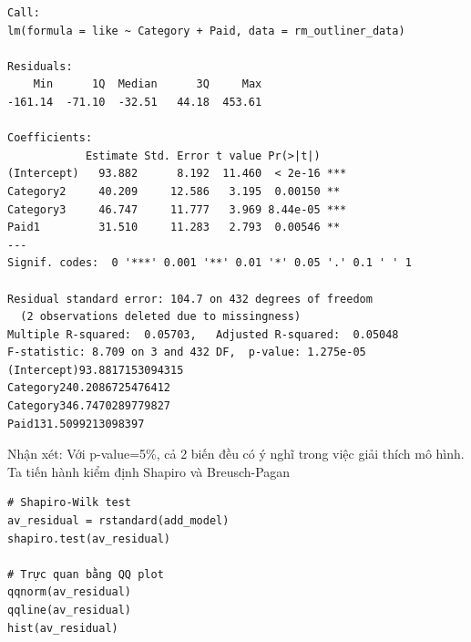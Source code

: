 \begin{itemize}
\begin{lstlisting}
Call:
lm(formula = like ~ Category + Paid, data = rm_outliner_data)

Residuals:
    Min      1Q  Median      3Q     Max 
-161.14  -71.10  -32.51   44.18  453.61 

Coefficients:
            Estimate Std. Error t value Pr(>|t|)    
(Intercept)   93.882      8.192  11.460  < 2e-16 ***
Category2     40.209     12.586   3.195  0.00150 ** 
Category3     46.747     11.777   3.969 8.44e-05 ***
Paid1         31.510     11.283   2.793  0.00546 ** 
---
Signif. codes:  0 '***' 0.001 '**' 0.01 '*' 0.05 '.' 0.1 ' ' 1

Residual standard error: 104.7 on 432 degrees of freedom
  (2 observations deleted due to missingness)
Multiple R-squared:  0.05703,	Adjusted R-squared:  0.05048 
F-statistic: 8.709 on 3 and 432 DF,  p-value: 1.275e-05
(Intercept)93.8817153094315
Category240.2086725476412
Category346.7470289779827
Paid131.5099213098397

    \end{lstlisting}
   Nhận xét: Với p-value=5\%, cả 2 biến đều có ý nghĩ trong việc giải thích mô hình. Ta tiến hành kiểm định Shapiro và Breusch-Pagan

\begin{lstlisting}
# Shapiro-Wilk test
av_residual = rstandard(add_model)
shapiro.test(av_residual)

# Trực quan bằng QQ plot
qqnorm(av_residual)
qqline(av_residual)
hist(av_residual)
\end{lstlisting}


\end{itemize}
